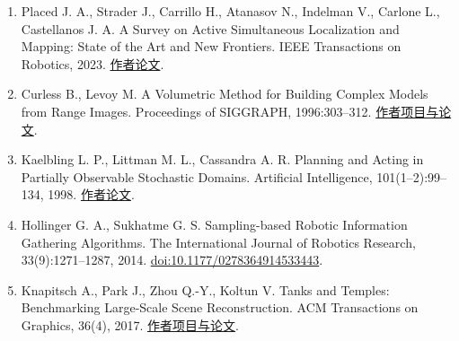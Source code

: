 \documentclass[11pt,a4paper]{article}
\begin{document}
\begin{enumerate}
  World Economic Forum. Physical AI: Powering the New Age of Industrial Operations. White paper, 2025-09-04. \href{https://www.weforum.org/publications/physical-ai-powering-the-new-age-of-industrial-operations/}{官方白皮书}.
\item
  Placed J. A., Strader J., Carrillo H., Atanasov N., Indelman V., Carlone L., Castellanos J. A. A Survey on Active Simultaneous Localization and Mapping: State of the Art and New Frontiers. IEEE Transactions on Robotics, 2023. \href{https://arxiv.org/abs/2207.00254}{作者论文}.
\item
  Curless B., Levoy M. A Volumetric Method for Building Complex Models from Range Images. Proceedings of SIGGRAPH, 1996:303--312. \href{https://graphics.stanford.edu/papers/volrange/}{作者项目与论文}.
\item
  Kaelbling L. P., Littman M. L., Cassandra A. R. Planning and Acting in Partially Observable Stochastic Domains. Artificial Intelligence, 101(1--2):99--134, 1998. \href{https://www.cassandra.org/arc/papers/aij98.pdf}{作者论文}.
\item
  Hollinger G. A., Sukhatme G. S. Sampling-based Robotic Information Gathering Algorithms. The International Journal of Robotics Research, 33(9):1271--1287, 2014. \href{https://doi.org/10.1177/0278364914533443}{doi:10.1177/0278364914533443}.
\item
  Knapitsch A., Park J., Zhou Q.-Y., Koltun V. Tanks and Temples: Benchmarking Large-Scale Scene Reconstruction. ACM Transactions on Graphics, 36(4), 2017. \href{https://www.tanksandtemples.org/}{作者项目与论文}.
\end{enumerate}
\end{document}
